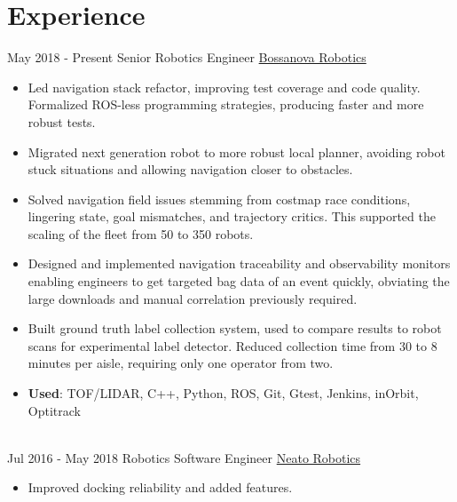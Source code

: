 \documentclass[letterpaper]{twentysecondcv} %
\begin{document}
\makeprofile %


\section{Experience}

\begin{twenty} %
\twentyitem
    	{May 2018 -}
		{Present}
        {Senior Robotics Engineer}
        {\href{http://www.bossanova.com/}{Bossanova Robotics}}
        {}
				{\begin{itemize}
			    \item Led navigation stack refactor, improving test coverage and code quality.
					      Formalized ROS-less programming strategies, producing faster and more robust tests.
					\item Migrated next generation robot to more robust local planner, avoiding
					      robot stuck situations and allowing navigation closer to obstacles.
					\item Solved navigation field issues stemming from costmap race conditions,
					      lingering state, goal mismatches, and trajectory critics. This
								supported the scaling of the fleet from 50 to 350 robots.
			    \item Designed and implemented navigation traceability and observability monitors
					      enabling engineers to get targeted bag data of an event quickly, obviating
								the large downloads and manual correlation previously required.
			    \item Built ground truth label collection system, used to compare results to robot
			          scans for experimental label detector. Reduced collection time from 30 to
								8 minutes per aisle, requiring only one operator from two.
			    \item \textbf{Used}: TOF/LIDAR, C++, Python, ROS, Git, Gtest, Jenkins, inOrbit, Optitrack
			  \end{itemize}}
        \\
	\twentyitem
    	{Jul 2016 -}
		{May 2018}
        {Robotics Software Engineer}
        {\href{http://www.neatorobotics.com/}{Neato Robotics}}
        {}
        {
        {\begin{itemize}
        \item Improved docking reliability and added features.

\end{itemize}}}
\end{twenty}
\end{document}
